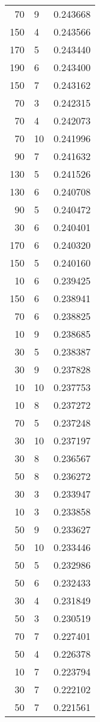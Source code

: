 \begin{tabular}{rlr}
70 & 9 & 0.243668 \\
150 & 4 & 0.243566 \\
170 & 5 & 0.243440 \\
190 & 6 & 0.243400 \\
150 & 7 & 0.243162 \\
70 & 3 & 0.242315 \\
70 & 4 & 0.242073 \\
70 & 10 & 0.241996 \\
90 & 7 & 0.241632 \\
130 & 5 & 0.241526 \\
130 & 6 & 0.240708 \\
90 & 5 & 0.240472 \\
30 & 6 & 0.240401 \\
170 & 6 & 0.240320 \\
150 & 5 & 0.240160 \\
10 & 6 & 0.239425 \\
150 & 6 & 0.238941 \\
70 & 6 & 0.238825 \\
10 & 9 & 0.238685 \\
30 & 5 & 0.238387 \\
30 & 9 & 0.237828 \\
10 & 10 & 0.237753 \\
10 & 8 & 0.237272 \\
70 & 5 & 0.237248 \\
30 & 10 & 0.237197 \\
30 & 8 & 0.236567 \\
50 & 8 & 0.236272 \\
30 & 3 & 0.233947 \\
10 & 3 & 0.233858 \\
50 & 9 & 0.233627 \\
50 & 10 & 0.233446 \\
50 & 5 & 0.232986 \\
50 & 6 & 0.232433 \\
30 & 4 & 0.231849 \\
50 & 3 & 0.230519 \\
70 & 7 & 0.227401 \\
50 & 4 & 0.226378 \\
10 & 7 & 0.223794 \\
30 & 7 & 0.222102 \\
50 & 7 & 0.221561 \\
\bottomrule
\end{tabular}

